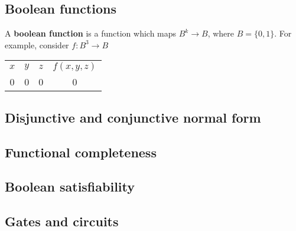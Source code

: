 \subsection{Boolean functions}

A \textbf{boolean function} is a function which maps $B^k \rightarrow B$,
where $B = \{0,1\}$. For example, consider $f:B^3 \rightarrow B$

\begin{tabular}{ccc|c}
  $x$ & $y$ & $z$ & $f(x, y, z)$ \\
  0   & 0   & 0   & 0
\end{tabular}

\subsection{Disjunctive and conjunctive normal form}
\subsection{Functional completeness}
\subsection{Boolean satisfiability}
\subsection{Gates and circuits}
